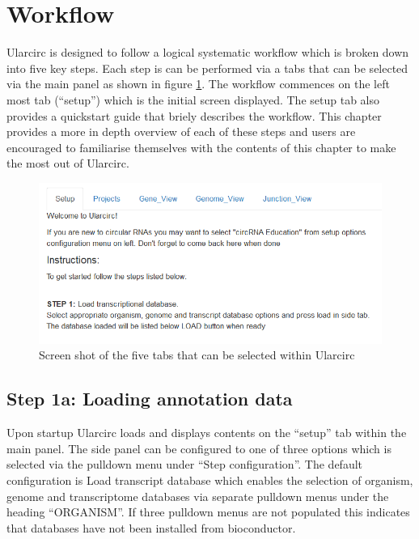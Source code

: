 \documentclass[12pt]{article}
\begin{document}
\section{Workflow} \label{sec:workflow}
Ularcirc is designed to follow a logical systematic workflow which is broken down into five key steps. Each step is can be performed  via a tabs that can be selected via the main panel as shown in figure \ref{fig:UlarcircTabs}. The workflow commences on the left most tab (``setup'') which is  the initial screen displayed. The setup tab also  provides a quickstart guide that briely describes the workflow. This chapter provides a more in depth overview of each of these steps and users are encouraged to familiarise themselves with the contents of this chapter to make the most out of Ularcirc.

\begin{figure}[h]
  \includegraphics[width=\linewidth,frame]{MainPanelTabs}
  \caption { Screen shot of the five tabs that can be selected within Ularcirc }
  \label{fig:UlarcircTabs}
\end{figure}
\subsection{Step 1a: Loading annotation data} \label{sec:Step1a}
Upon startup Ularcirc loads and displays contents on the ``setup'' tab within the main panel. The side panel can be configured to one of three options which is selected via the pulldown menu under ``Step configuration''. The default configuration  is Load transcript database which enables the selection of organism, genome and transcriptome databases via separate pulldown menus under the heading ``ORGANISM''. If three pulldown menus are not populated this indicates that databases have not been installed from bioconductor.
\end{document}

